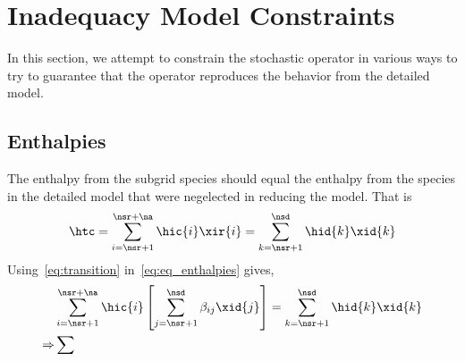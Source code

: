 \section{Inadequacy Model Constraints}
In this section, we attempt to constrain the stochastic operator in various ways to try to guarantee that the operator reproduces the behavior from the detailed model.

\subsection{Enthalpies}
The enthalpy from the subgrid species should equal the enthalpy from the species in the detailed model that were negelected in reducing the model.  That is
\begin{align}
  \htc = \sum_{i=\nsr + 1}^{\nsr + \na}{\hic{i}\xir{i}} = \sum_{k=\nsr+1}^{\nsd}{\hid{k}\xid{k}} \label{eq:eq_enthalpies}
\end{align}
Using~\eqref{eq:transition} in~\eqref{eq:eq_enthalpies} gives,
\begin{align}
  &\sum_{i=\nsr+1}^{\nsr + \na}{\hic{i}\left[\sum_{j=\nsr+1}^{\nsd}{\beta_{ij}\xid{j}}\right]} = \sum_{k=\nsr+1}^{\nsd}{\hid{k}\xid{k}} \\
  \Rightarrow & \sum
\end{align}
